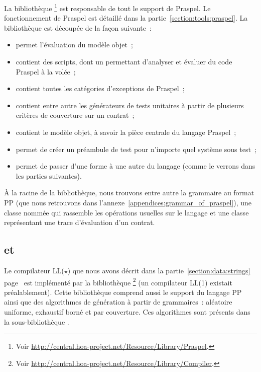 La bibliothèque \footnote{Voir
\url{http://central.hoa-project.net/Resource/Library/Praspel}.} est responsable
de tout le support de Praspel. Le fonctionnement de Praspel est détaillé dans la
partie~\ref{section:tools:praspel}. La bibliothèque est découpée de la façon
suivante~:
%
\begin{itemize}

\item {} permet l'évaluation du modèle objet~;

\item {} contient des scripts, dont un  permettant
d'analyser et évaluer du code Praspel à la volée~;

\item {} contient toutes les catégories d'exceptions de Praspel~;

\item {} contient entre autre les générateurs de tests unitaires à
partir de plusieurs critères de couverture sur un contrat~;

\item {} contient le modèle objet, à savoir la pièce centrale du
langage Praspel~;

\item {} permet de créer un préambule de test pour n'importe quel
système sous test~;

\item {} permet de passer d'une forme à une autre du langage (comme
le verrons dans les parties suivantes).

\end{itemize}

À la racine de la bibliothèque, nous trouvons entre autre la grammaire au format
PP (que nous retrouvons dans l'annexe~\ref{appendices:grammar_of_praspel}), une
classe nommée  qui rassemble les opérations usuelles
sur le langage et une classe représentant une trace d'évaluation d'un contrat.

\subsection{ et }
\label{subsection:tools:hoa-compiler-regex}

Le compilateur LL($\star$) que nous avons décrit dans la
partie~\ref{section:data:strings} page~\pageref{section:data:strings} est
implémenté par la bibliothèque
\footnote{Voir
\url{http://central.hoa-project.net/Resource/Library/Compiler}.} (un compilateur
LL(1) existait préalablement). Cette bibliothèque comprend aussi le support du
langage PP ainsi que des algorithmes de génération à partir de grammaires~:
aléatoire uniforme, exhaustif borné et par couverture. Ces algorithmes sont
présents dans la sous-bibliothèque
.

